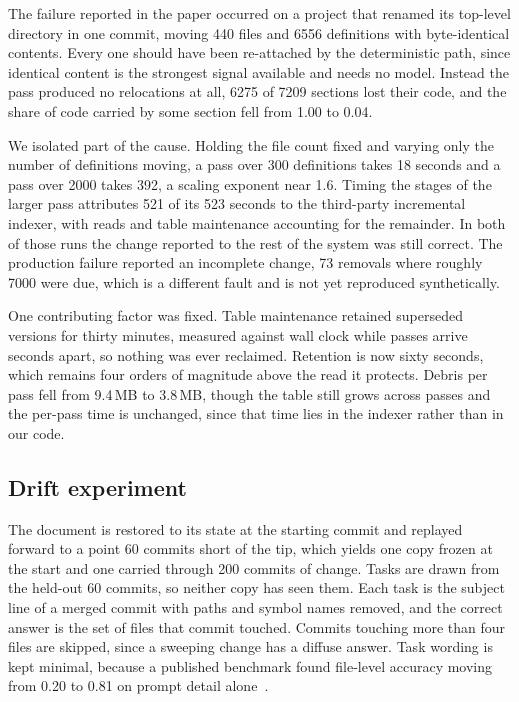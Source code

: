 The failure reported in the paper occurred on a project that renamed its top-level directory in one commit, moving 440 files and 6556 definitions with byte-identical contents. Every one should have been re-attached by the deterministic path, since identical content is the strongest signal available and needs no model. Instead the pass produced no relocations at all, 6275 of 7209 sections lost their code, and the share of code carried by some section fell from 1.00 to 0.04.

We isolated part of the cause. Holding the file count fixed and varying only the number of definitions moving, a pass over 300 definitions takes 18 seconds and a pass over 2000 takes 392, a scaling exponent near 1.6. Timing the stages of the larger pass attributes 521 of its 523 seconds to the third-party incremental indexer, with reads and table maintenance accounting for the remainder. In both of those runs the change reported to the rest of the system was still correct. The production failure reported an incomplete change, 73 removals where roughly 7000 were due, which is a different fault and is not yet reproduced synthetically.

One contributing factor was fixed. Table maintenance retained superseded versions for thirty minutes, measured against wall clock while passes arrive seconds apart, so nothing was ever reclaimed. Retention is now sixty seconds, which remains four orders of magnitude above the read it protects. Debris per pass fell from 9.4\,MB to 3.8\,MB, though the table still grows across passes and the per-pass time is unchanged, since that time lies in the indexer rather than in our code.

\subsection{Drift experiment}
\label{app:drift}

The document is restored to its state at the starting commit and replayed forward to a point 60 commits short of the tip, which yields one copy frozen at the start and one carried through 200 commits of change. Tasks are drawn from the held-out 60 commits, so neither copy has seen them. Each task is the subject line of a merged commit with paths and symbol names removed, and the correct answer is the set of files that commit touched. Commits touching more than four files are skipped, since a sweeping change has a diffuse answer. Task wording is kept minimal, because a published benchmark found file-level accuracy moving from 0.20 to 0.81 on prompt detail alone~\cite{timeconsistent2026}.


